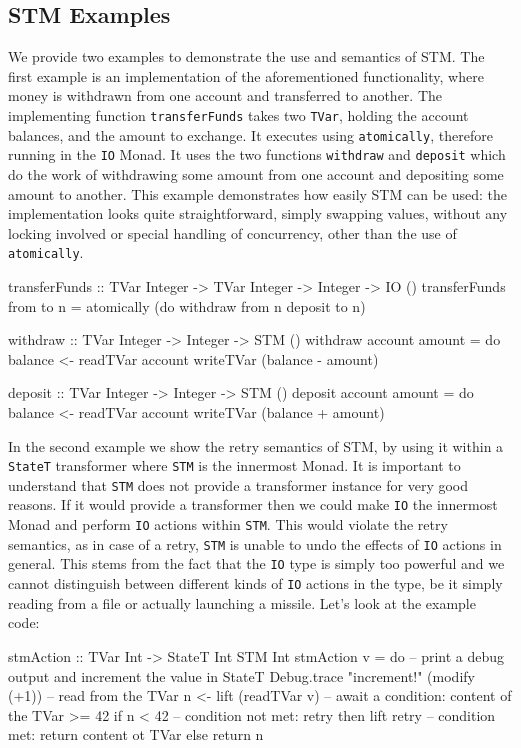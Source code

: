 \subsection{STM Examples}
We provide two examples to demonstrate the use and semantics of STM. The first example is an implementation of the aforementioned functionality, where money is withdrawn from one account and transferred to another. The implementing function \texttt{transferFunds} takes two \texttt{TVar}, holding the account balances, and the amount to exchange. It executes using \texttt{atomically}, therefore running in the \texttt{IO} Monad. It uses the two functions \texttt{withdraw} and \texttt{deposit} which do the work of withdrawing some amount from one account and depositing some amount to another. This example demonstrates how easily STM can be used: the implementation looks quite straightforward, simply swapping values, without any locking involved or special handling of concurrency, other than the use of \texttt{atomically}.

\begin{HaskellCode}
transferFunds :: TVar Integer -> TVar Integer -> Integer -> IO ()
transferFunds from to n = atomically (do
  withdraw from n
  deposit to n)
  
withdraw :: TVar Integer -> Integer -> STM ()
withdraw account amount = do
  balance <- readTVar account
  writeTVar (balance - amount)
  
deposit :: TVar Integer -> Integer -> STM ()
deposit account amount = do
  balance <- readTVar account
  writeTVar (balance + amount)
\end{HaskellCode}

In the second example we show the retry semantics of STM, by using it within a \texttt{StateT} transformer where \texttt{STM} is the innermost Monad. It is important to understand that \texttt{STM} does not provide a transformer instance for very good reasons. If it would provide a transformer then we could make \texttt{IO} the innermost Monad and perform \texttt{IO} actions within \texttt{STM}. This would violate the retry semantics, as in case of a retry, \texttt{STM} is unable to undo the effects of \texttt{IO} actions in general. This stems from the fact that the \texttt{IO} type is simply too powerful and we cannot distinguish between different kinds of \texttt{IO} actions in the type, be it simply reading from a file or actually launching a missile. Let's look at the example code:

\begin{HaskellCode}
stmAction :: TVar Int -> StateT Int STM Int 
stmAction v = do
  -- print a debug output and increment the value in StateT 
  Debug.trace "increment!" (modify (+1))
  -- read from the TVar
  n <- lift (readTVar v)
  -- await a condition: content of the TVar >= 42
  if n < 42
    -- condition not met: retry
    then lift retry
    -- condition met: return content ot TVar
    else return n
\end{HaskellCode}

